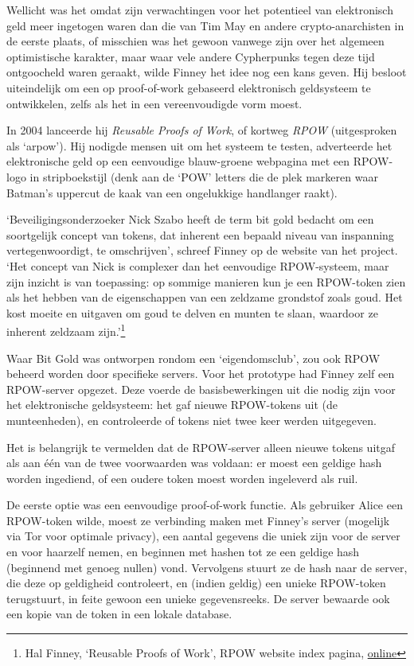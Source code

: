 \documentclass[smalldemyvopaper,11pt,twoside,onecolumn,openright,extrafontsizes,hidelinks]{memoir}
\begin{document}
Wellicht was het omdat zijn verwachtingen voor het potentieel van
elektronisch geld meer ingetogen waren dan die van Tim May en andere
crypto-anarchisten in de eerste plaats, of misschien was het gewoon
vanwege zijn over het algemeen optimistische karakter, maar waar vele
andere Cypherpunks tegen deze tijd ontgoocheld waren geraakt, wilde
Finney het idee nog een kans geven. Hij besloot uiteindelijk om een op
proof-of-work gebaseerd elektronisch geldsysteem te ontwikkelen, zelfs
als het in een vereenvoudigde vorm moest.

In 2004 lanceerde hij \emph{Reusable Proofs of Work}, of kortweg
\emph{RPOW} (uitgesproken als `arpow'). Hij nodigde mensen uit om het
systeem te testen, adverteerde het elektronische geld op een eenvoudige
blauw-groene webpagina met een RPOW-logo in stripboekstijl (denk aan de
`POW' letters die de plek markeren waar Batman's uppercut de kaak van
een ongelukkige handlanger raakt).

`Beveiligingsonderzoeker Nick Szabo heeft de term bit gold bedacht om
een soortgelijk concept van tokens, dat inherent een bepaald niveau van
inspanning vertegenwoordigt, te omschrijven', schreef Finney op de
website van het project. `Het concept van Nick is complexer dan het
eenvoudige RPOW-systeem, maar zijn inzicht is van toepassing: op sommige
manieren kun je een RPOW-token zien als het hebben van de eigenschappen
van een zeldzame grondstof zoals goud. Het kost moeite en uitgaven om
goud te delven en munten te slaan, waardoor ze inherent zeldzaam
zijn.'\footnote{Hal Finney, `Reusable Proofs of Work', RPOW website
  index pagina,
  \href{https://web.archive.org/web/20090217090451/http://rpow.net/index.html}{online}}

Waar Bit Gold was ontworpen rondom een `eigendomsclub', zou ook RPOW
beheerd worden door specifieke servers. Voor het prototype had Finney
zelf een RPOW-server opgezet. Deze voerde de basisbewerkingen uit die
nodig zijn voor het elektronische geldsysteem: het gaf nieuwe
RPOW-tokens uit (de munteenheden), en controleerde of tokens niet twee
keer werden uitgegeven.

Het is belangrijk te vermelden dat de RPOW-server alleen nieuwe tokens
uitgaf als aan één van de twee voorwaarden was voldaan: er moest een
geldige hash worden ingediend, of een oudere token moest worden
ingeleverd als ruil.

De eerste optie was een eenvoudige proof-of-work functie. Als gebruiker
Alice een RPOW-token wilde, moest ze verbinding maken met Finney's
server (mogelijk via Tor voor optimale privacy), een aantal gegevens die
uniek zijn voor de server en voor haarzelf nemen, en beginnen met hashen
tot ze een geldige hash (beginnend met genoeg nullen) vond. Vervolgens
stuurt ze de hash naar de server, die deze op geldigheid controleert, en
(indien geldig) een unieke RPOW-token terugstuurt, in feite gewoon een
unieke gegevensreeks. De server bewaarde ook een kopie van de token in
een lokale database.
\end{document}
